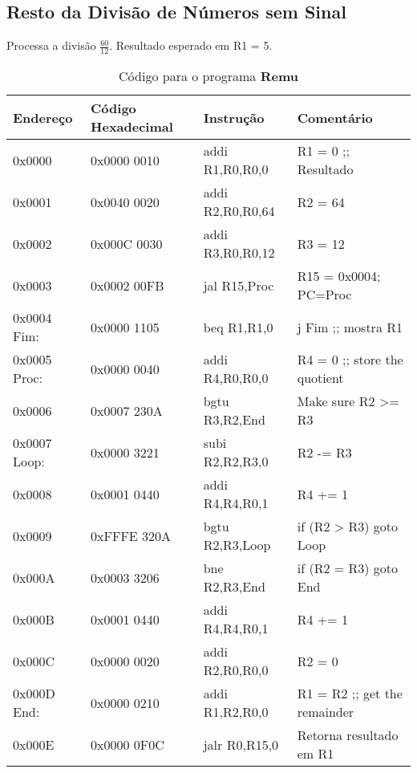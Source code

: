 \documentclass[12pt]{article}
\begin{document}
\subsection{Resto da Divisão de Números sem Sinal}\label{sec:programs:remu}

Processa a divisão $\frac{60}{12}$. Resultado esperado em R1 = 5.

\begin{table}[H]
    \centering
    \caption{Código para o programa \textbf{Remu}}
    \begin{tabular}{|l|l|l|l|}\hline
        \textbf{Endereço} & \textbf{Código Hexadecimal} & \textbf{Instrução} & \textbf{Comentário} \\\hline
        0x0000       & 0x0000 0010 & addi R1,R0,R0,0  & R1 = 0 ;; Resultado           \\\hline
        0x0001       & 0x0040 0020 & addi R2,R0,R0,64 & R2 = 64                       \\\hline
        0x0002       & 0x000C 0030 & addi R3,R0,R0,12 & R3 = 12                       \\\hline
        0x0003       & 0x0002 00FB & jal R15,Proc     & R15 = 0x0004; PC=Proc         \\\hline
        0x0004 Fim:  & 0x0000 1105 & beq R1,R1,0      & j Fim ;; mostra R1            \\\hline
        0x0005 Proc: & 0x0000 0040 & addi R4,R0,R0,0  & R4 = 0 ;; store the quotient  \\\hline
        0x0006       & 0x0007 230A & bgtu R3,R2,End   & Make sure R2 >= R3            \\\hline
        0x0007 Loop: & 0x0000 3221 & subi R2,R2,R3,0  & R2 -= R3                      \\\hline
        0x0008       & 0x0001 0440 & addi R4,R4,R0,1  & R4 += 1                       \\\hline
        0x0009       & 0xFFFE 320A & bgtu R2,R3,Loop  & if (R2 > R3) goto Loop        \\\hline
        0x000A       & 0x0003 3206 & bne  R2,R3,End   & if (R2 \!= R3) goto End       \\\hline
        0x000B       & 0x0001 0440 & addi R4,R4,R0,1  & R4 += 1                       \\\hline
        0x000C       & 0x0000 0020 & addi R2,R0,R0,0  & R2 = 0                        \\\hline
        0x000D End:  & 0x0000 0210 & addi R1,R2,R0,0  & R1 = R2 ;; get the remainder  \\\hline
        0x000E       & 0x0000 0F0C & jalr R0,R15,0    & Retorna resultado em R1       \\\hline
    \end{tabular}\label{tab:programs:remu}
\end{table}
\end{document}
